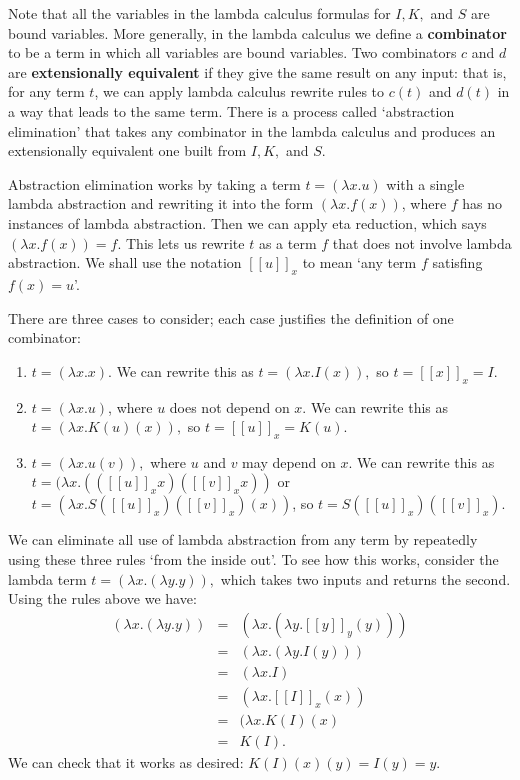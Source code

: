 \documentclass[12pt]{article}
\begin{document}
Note that all the variables in the lambda calculus formulas for $I,
K,$ and $S$ are bound variables.  More generally, in the lambda
calculus we define a {\bf combinator} to be a term in which all
variables are bound variables.  Two combinators $c$ and $d$ are {\bf
extensionally equivalent} if they give the same result on any input:
that is, for any term $t$, we can apply lambda calculus rewrite rules
to $c(t)$ and $d(t)$ in a way that leads to the same term.  There is
a process called `abstraction elimination' that takes any combinator
in the lambda calculus and produces an extensionally equivalent one
built from $I, K,$ and $S$.

Abstraction elimination works by taking a term $t = (\lambda x.u)$
with a single lambda abstraction and rewriting it into the form
$(\lambda x.f(x))$, where $f$ has no instances of lambda abstraction.
Then we can apply eta reduction, which says $(\lambda x. f(x)) = f$.
This lets us rewrite $t$ as a term $f$ that does not involve lambda
abstraction.  We shall use the notation $[[u]]_x$ to mean `any term
$f$ satisfing $f(x) = u$'.

There are three cases to consider; each case justifies the definition 
of one combinator:
\begin{enumerate}
  \item $t = (\lambda x.x)$. 
    We can rewrite this as $t = (\lambda x.I(x)),$ so $t = [[x]]_x = I$.  
  \item $t = (\lambda x. u)$, where $u$ does not depend on $x$.
    We can rewrite this as $t = (\lambda x. K(u)(x)),$ so 
   $t = [[u]]_x = K(u).$
  \item $t = (\lambda x. u(v)),$ where $u$ and $v$ may depend
    on $x$.  We can rewrite this as 
    $t = (\lambda x.(([[u]]_x x) ([[v]]_x x))$ or
    $t = (\lambda x. S([[u]]_x)([[v]]_x)(x))$, so $t = S([[u]]_x)([[v]]_x).$
\end{enumerate}

We can eliminate all use of lambda abstraction from any term by
repeatedly using these three rules `from the inside out'.  To see
how this works, consider the lambda term $t = (\lambda
x. (\lambda y. y)),$ which takes two inputs and returns the second.
Using the rules above we have:
\[
\begin{array}{ccl}
  (\lambda x. (\lambda y.y)) 
    &=& (\lambda x. (\lambda y. [[y]]_y(y))) \\
    &=& (\lambda x. (\lambda y. I(y))) \\
    &=& (\lambda x.I) \\
    &=& (\lambda x. [[I]]_x(x)) \\
    &=& (\lambda x. K(I)(x) \\
    &=& K(I) .
\end{array}
\]
We can check that it works as desired: $K(I)(x)(y) = I(y) = y.$  
\end{document}
